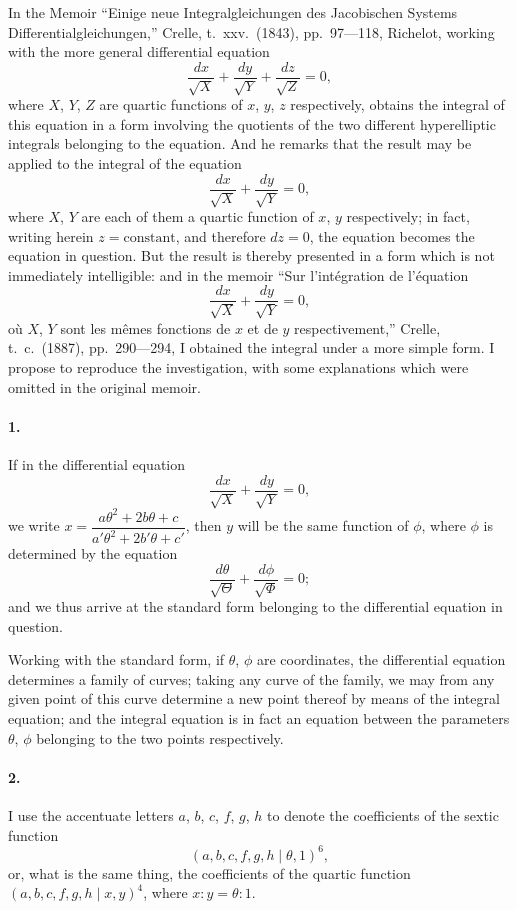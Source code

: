 \documentclass[11pt,a4paper]{article}
\theoremstyle{plain}
\begin{document}
In the Memoir ``Einige neue Integralgleichungen des Jacobischen Systems Differentialgleichungen,'' Crelle, t.~xxv.~(1843), pp.~97---118, Richelot, working with the more general differential equation
\[
\frac{dx}{\sqrt{X}} + \frac{dy}{\sqrt{Y}} + \frac{dz}{\sqrt{Z}} = 0,
\]
where $X$, $Y$, $Z$ are quartic functions of $x$, $y$, $z$ respectively, obtains the integral of this equation in a form involving the quotients of the two different hyperelliptic integrals belonging to the equation. And he remarks that the result may be applied to the integral of the equation
\[
\frac{dx}{\sqrt{X}} + \frac{dy}{\sqrt{Y}} = 0,
\]
where $X$, $Y$ are each of them a quartic function of $x$, $y$ respectively; in fact, writing herein $z = \text{constant}$, and therefore $dz = 0$, the equation becomes the equation in question. But the result is thereby presented in a form which is not immediately intelligible: and in the memoir ``Sur l'int\'egration de l'\'equation
\[
\frac{dx}{\sqrt{X}} + \frac{dy}{\sqrt{Y}} = 0,
\]
o\`u $X$, $Y$ sont les m\^emes fonctions de $x$ et de $y$ respectivement,'' Crelle, t.~c.~(1887), pp.~290---294, I obtained the integral under a more simple form. I propose to reproduce the investigation, with some explanations which were omitted in the original memoir.

\paragraph{1.} If in the differential equation
\[
\frac{dx}{\sqrt{X}} + \frac{dy}{\sqrt{Y}} = 0,
\]
we write $x = \dfrac{a\theta^2 + 2b\theta + c}{a'\theta^2 + 2b'\theta + c'}$, then $y$ will be the same function of $\phi$, where $\phi$ is determined by the equation
\[
\frac{d\theta}{\sqrt{\Theta}} + \frac{d\phi}{\sqrt{\Phi}} = 0;
\]
and we thus arrive at the standard form belonging to the differential equation in question.

Working with the standard form, if $\theta$, $\phi$ are coordinates, the differential equation determines a family of curves; taking any curve of the family, we may from any given point of this curve determine a new point thereof by means of the integral equation; and the integral equation is in fact an equation between the parameters $\theta$, $\phi$ belonging to the two points respectively.

\paragraph{2.} I use the accentuate letters $a$, $b$, $c$, $f$, $g$, $h$ to denote the coefficients of the sextic function
\[
(a, b, c, f, g, h\mid\theta, 1)^6,
\]
or, what is the same thing, the coefficients of the quartic function $(a, b, c, f, g, h\mid x, y)^4$, where $x : y = \theta : 1$.
\end{document}
